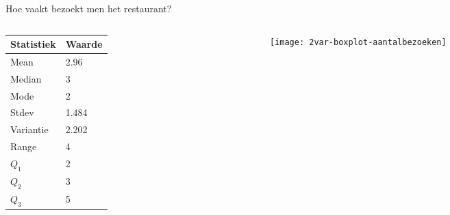 \documentclass[aspectratio=169]{beamer}
\begin{document}
\begin{frame}{Hoe vaakt bezoekt men het restaurant?}
  \begin{columns}
    \begin{column}{0.5\textwidth}
      \begin{table}[h]
        \small
        \begin{tabular}{|l|l|}
          \hline
          { \textbf{Statistiek}} & \textbf{Waarde} \\ \hline
          Mean                   & 2.96            \\ \hline
          Median                 & 3               \\ \hline
          Mode                   & 2               \\ \hline
          Stdev                  & 1.484           \\ \hline
          Variantie              & 2.202           \\ \hline
          Range                  & 4               \\ \hline
          $Q_{1}$                & 2               \\ \hline
          $Q_{2}$                & 3               \\ \hline
          $Q_{3}$                & 5               \\ \hline
        \end{tabular}
      \end{table}
    \end{column}
    \begin{column}{0.5\textwidth}
      
      \begin{figure}
        \centering
        \texttt{[image: 2var-boxplot-aantalbezoeken]}
        \label{fig:boxplotStudenten}
      \end{figure}
      
    \end{column}
  \end{columns}
\end{frame}
\end{document}
